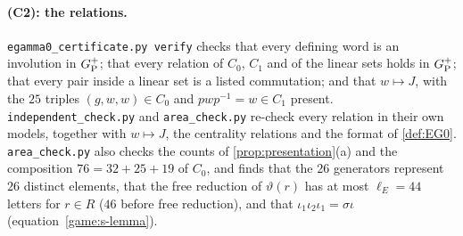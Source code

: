 \paragraph{(C2): the relations.} \texttt{egamma0\_certificate.py verify} checks that every defining word is an involution in $G_{\mathrm P}^{+}$; that
every relation of $C_0$, $C_1$ and of the linear sets holds in $G_{\mathrm P}^{+}$; that every pair inside a linear set is a listed commutation; and that
$w\mapsto J$, with the $25$ triples $(g,w,w)\in C_0$ and $pwp^{-1}=w\in C_1$ present. \texttt{independent\_check.py} and
\texttt{area\_check.py} re-check every relation in their own models, together with $w\mapsto J$, the centrality relations and the format
of \cref{def:EG0}. \texttt{area\_check.py} also checks the counts of \cref{prop:presentation}(a) and the composition $76=32+25+19$ of $C_0$,
and finds that the $26$ generators represent $26$ distinct elements, that the free reduction of $\vartheta(r)$ has at most $\ell_E=44$
letters for $r\in R$ ($46$ before free reduction), and that $\iota_1\iota_2\iota_1=\sigma\iota$ (equation~\eqref{game:s-lemma}).

